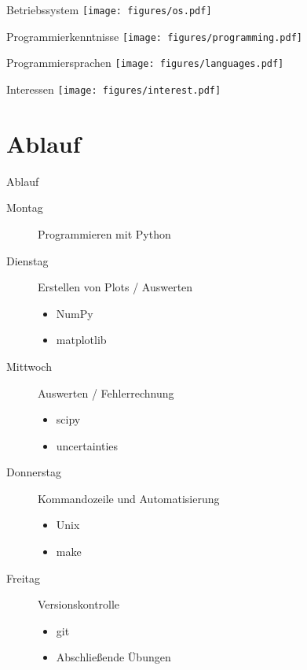 
\begin{frame}{Betriebssystem}
  \centering
  \texttt{[image: figures/os.pdf]}
\end{frame}

\begin{frame}{Programmierkenntnisse}
  \centering
  \texttt{[image: figures/programming.pdf]}
\end{frame}

\begin{frame}{Programmiersprachen}
  \centering
  \texttt{[image: figures/languages.pdf]}
\end{frame}

\begin{frame}{Interessen}
  \centering
  \texttt{[image: figures/interest.pdf]}
\end{frame}

\section{Ablauf}

\begin{frame}{Ablauf}
  \begin{description}
    \item[Montag] Programmieren mit Python
    \item[Dienstag] Erstellen von Plots / Auswerten
      \begin{itemize}
        \item NumPy
        \item matplotlib
      \end{itemize}
    \item[Mittwoch] Auswerten / Fehlerrechnung
      \begin{itemize}
        \item scipy
        \item uncertainties
      \end{itemize}
    \item[Donnerstag] Kommandozeile und Automatisierung
      \begin{itemize}
        \item Unix
        \item make
      \end{itemize}
    \item[Freitag] Versionskontrolle
      \begin{itemize}
        \item git
        \item Abschließende Übungen
      \end{itemize}
  \end{description}
\end{frame}

